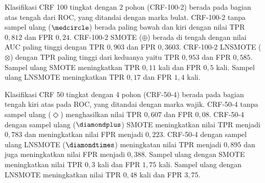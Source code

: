 Klasifikasi CRF 100 tingkat dengan 2 pohon (CRF-100-2) berada pada bagian atas
tengah dari ROC, yang ditandai dengan marka bulat.
CRF-100-2 tanpa sampel ulang ($\medcircle$) berada paling bawah dan kiri dengan
nilai TPR $0,812$ dan FPR $0,24$.
CRF-100-2 SMOTE ($\oplus$) berada di tengah dengan nilai AUC paling tinggi
dengan TPR $0,903$ dan FPR $0,3603$.
CRF-100-2 LNSMOTE ($\otimes$) dengan TPR paling tinggi dari keduanya yaitu TPR
$0,953$ dan FPR $0,585$.
Sampel ulang SMOTE meningkatkan TPR $0,11$ kali dan FPR $0,5$ kali.
Sampel ulang LNSMOTE meningkatkan TPR $0,17$ dan FPR $1,4$ kali.

Klasifikasi CRF 50 tingkat dengan 4 pohon (CRF-50-4) berada pada bagian tengah
kiri atas pada ROC, yang ditandai dengan marka wajik.
CRF-50-4 tanpa sampel ulang ($\Diamond$) menghasilkan nilai TPR $0,607$ dan FPR
$0,08$.
CRF-50-4 dengan sampel ulang ($\diamondplus$) SMOTE meningkatkan nilai TPR
menjadi $0,783$ dan meningkatkan nilai FPR menjadi $0,223$.
CRF-50-4 dengan sampel ulang LNSMOTE ($\diamondtimes$) meningkatan nilai TPR
menjadi $0,895$ dan juga meningkatkan nilai FPR menjadi $0,388$.
Sampel ulang dengan SMOTE meningkatkan nilai TPR $0,3$ kali dan FPR $1,75$
kali.
Sampel ulang dengan LNSMOTE meningkatkan nilai TPR $0,48$ kali dan FPR $3,75$.
